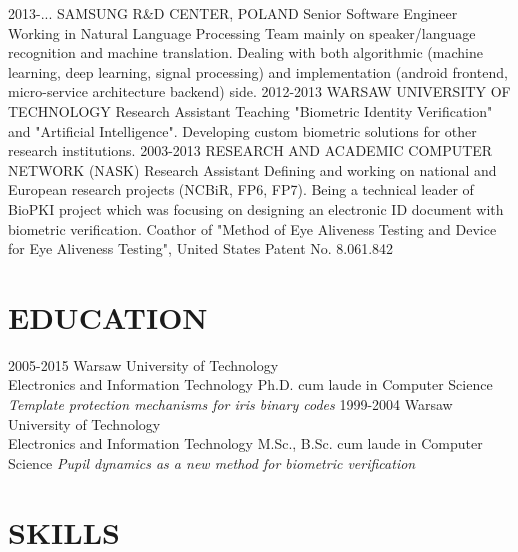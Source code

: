 \documentclass[]{mchcv}
\begin{document}
\begin{twenty}
  \twentyitem
    {2013-...}
    {SAMSUNG R\&D CENTER, POLAND}%
    {Senior Software Engineer}
    {Working in Natural Language Processing Team mainly on speaker/language recognition and machine translation. Dealing with both algorithmic (machine learning, deep learning, signal processing) and implementation (android frontend, micro-service architecture backend) side.}
  \twentyitem
    {2012-2013}
    {WARSAW UNIVERSITY OF TECHNOLOGY}%
    {Research Assistant}
	{Teaching "Biometric Identity Verification" and "Artificial Intelligence". Developing custom biometric solutions for other research institutions.}
  \twentyitem
    {2003-2013}
    {RESEARCH AND ACADEMIC COMPUTER NETWORK (NASK)}
    {Research Assistant}
    {Defining and working on national and European research projects (NCBiR, FP6, FP7). Being a technical leader of BioPKI project which was focusing on designing an electronic ID document with biometric verification. Coathor of "Method of Eye Aliveness Testing and Device for Eye Aliveness Testing", United States Patent No. 8.061.842}
\end{twenty}

\section{EDUCATION}
\begin{twenty}
  \twentyitem
    {2005-2015}
    {Warsaw University of Technology\\ Electronics and Information Technology}
    {Ph.D. cum laude in Computer Science}
    {\textit{Template protection mechanisms for iris binary codes}}
  \twentyitem
    {1999-2004}
    {Warsaw University of Technology\\ Electronics and Information Technology}
    {M.Sc., B.Sc. cum laude in Computer Science}
    {\textit{Pupil dynamics as a new method for biometric verification}}
\end{twenty}

\section{SKILLS}
\end{document}
